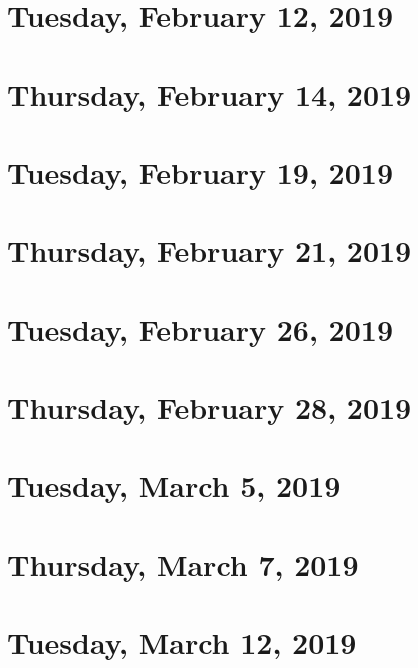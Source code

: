 \documentclass[reqno]{amsart}
\begin{document}
\section{Tuesday, February 12, 2019}
    

\section{Thursday, February 14, 2019}
    

\section{Tuesday, February 19, 2019}
    
    
\section{Thursday, February 21, 2019}
    

\section{Tuesday, February 26, 2019}
    

\section{Thursday, February 28, 2019}
    

\section{Tuesday, March 5, 2019}
    

\section{Thursday, March 7, 2019}
    

\section{Tuesday, March 12, 2019}
    
\end{document}
